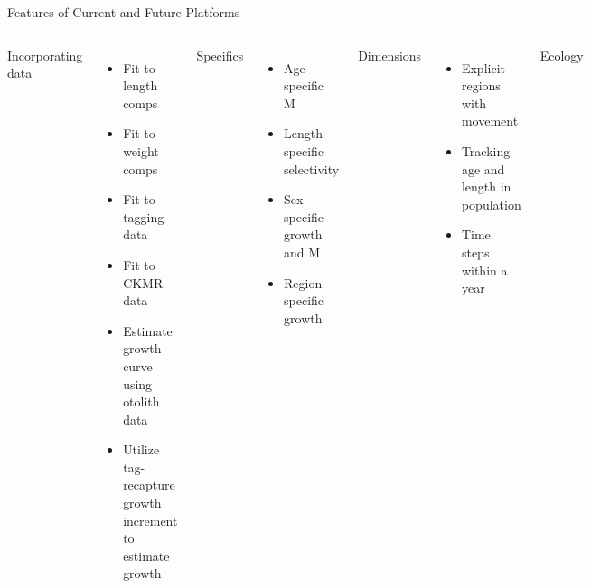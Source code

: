 \documentclass[aspectratio=169,fleqn]{beamer}
\begin{document}
\begin{frame}{Features of Current and Future Platforms}\small
  \vspace{-1.5ex}
  \begin{columns}[T]
    \gray
    Incorporating data\\[-0.5ex]
    \begin{itemize}\fns
      \item Fit to length comps\\[-1ex]
      \item Fit to weight comps\\[-1ex]
      \item Fit to tagging data\\[-1ex]
      \item Fit to CKMR data\\[-1ex]
      \item Estimate growth curve using otolith data\\[-1ex]
      \item Utilize tag-recapture growth increment to estimate growth\\[3ex]
    \end{itemize}
    Specifics\\[-0.5ex]
    \begin{itemize}\fns
      \item Age-specific M\\[-1ex]
      \item Length-specific selectivity\\[-1ex]
      \item Sex-specific growth and M\\[-1ex]
      \item Region-specific growth\\[3ex]
    \end{itemize}
    \gray
    Dimensions\\[-0.5ex]
    \begin{itemize}\fns
      \item Explicit regions with movement\\[-1ex]
      \item Tracking age and length in population\\[-1ex]
      \item Time steps within a year\\[3ex]
    \end{itemize}
    Ecology\\[-0.5ex]
    \begin{itemize}\fns

\end{itemize}
\end{columns}
\end{frame}
\end{document}
